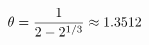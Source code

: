 \documentclass[preview]{standalone}
\begin{document}
\begin{align*}
\special{dvisvgm:raw <g id='unique000'>}\theta = \frac{1}{2 - 2^{1/3}} \approx 1.3512\special{dvisvgm:raw </g>}
\end{align*}
\end{document}
